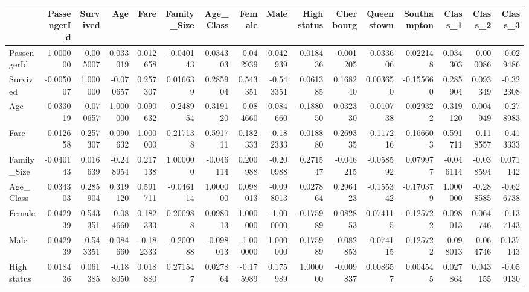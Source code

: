 \begin{tabular}{lrrrrrrrrrrrrrrr}
\toprule
{} &  PassengerId &  Survived &       Age &      Fare &  Family\_Size &  Age\_Class &    Female &      Male &  High status &  Cherbourg &  Queenstown &  Southampton &   Class\_1 &   Class\_2 &   Class\_3 \\
\midrule
PassengerId &     1.000000 & -0.005007 &  0.033019 &  0.012658 &    -0.040143 &   0.034303 & -0.042939 &  0.042939 &     0.018436 &  -0.001205 &   -0.033606 &     0.022148 &  0.034303 & -0.000086 & -0.029486 \\
Survived    &    -0.005007 &  1.000000 & -0.070657 &  0.257307 &     0.016639 &   0.285904 &  0.543351 & -0.543351 &     0.061385 &   0.168240 &    0.003650 &    -0.155660 &  0.285904 &  0.093349 & -0.322308 \\
Age         &     0.033019 & -0.070657 &  1.000000 &  0.090632 &    -0.248954 &   0.319120 & -0.084660 &  0.084660 &    -0.188050 &   0.032330 &   -0.010738 &    -0.029322 &  0.319120 &  0.004949 & -0.278983 \\
Fare        &     0.012658 &  0.257307 &  0.090632 &  1.000000 &     0.217138 &   0.591711 &  0.182333 & -0.182333 &     0.018880 &   0.269335 &   -0.117216 &    -0.166603 &  0.591711 & -0.118557 & -0.413333 \\
Family\_Size &    -0.040143 &  0.016639 & -0.248954 &  0.217138 &     1.000000 &  -0.046114 &  0.200988 & -0.200988 &     0.271547 &  -0.046215 &   -0.058592 &     0.079977 & -0.046114 & -0.038594 &  0.071142 \\
Age\_Class   &     0.034303 &  0.285904 &  0.319120 &  0.591711 &    -0.046114 &   1.000000 &  0.098013 & -0.098013 &     0.027864 &   0.296423 &   -0.155342 &    -0.170379 &  1.000000 & -0.288585 & -0.626738 \\
Female      &    -0.042939 &  0.543351 & -0.084660 &  0.182333 &     0.200988 &   0.098013 &  1.000000 & -1.000000 &    -0.175989 &   0.082853 &    0.074115 &    -0.125722 &  0.098013 &  0.064746 & -0.137143 \\
Male        &     0.042939 & -0.543351 &  0.084660 & -0.182333 &    -0.200988 &  -0.098013 & -1.000000 &  1.000000 &     0.175989 &  -0.082853 &   -0.074115 &     0.125722 & -0.098013 & -0.064746 &  0.137143 \\
High status &     0.018436 &  0.061385 & -0.188050 &  0.018880 &     0.271547 &   0.027864 & -0.175989 &  0.175989 &     1.000000 &  -0.009837 &    0.008657 &     0.004545 &  0.027864 &  0.043155 & -0.059130 \\

\end{tabular}
